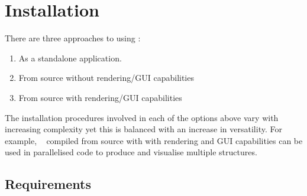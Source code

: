 \section{Installation}

There are three approaches to using \nanocap:

\begin{enumerate}
 \item As a standalone application.
 \item From source without rendering/GUI capabilities
 \item From source with rendering/GUI capabilities
\end{enumerate}

The installation procedures involved in each of the options above vary with increasing complexity yet this is balanced with an increase in versatility. For example, \nanocap~ compiled from source with with rendering and GUI capabilities can be used in parallelised code to produce and visualise multiple structures.


\subsection{Requirements}

